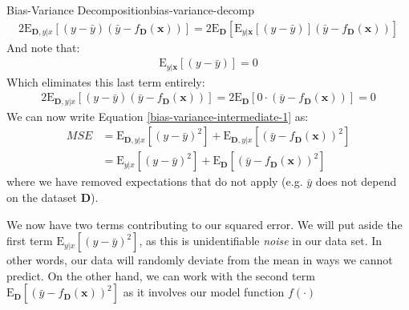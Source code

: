 \begin{derivation}{Bias-Variance Decomposition}{bias-variance-decomp}
    \begin{align*}
        2\mathrm{E}_{\textbf{D},y|x}[(y - \bar{y})(\bar{y} - f_\textbf{D}(\textbf{x}))] = 2\mathrm{E}_{\textbf{D}}[\mathrm{E}_{y|\textbf{x}}[(y - \bar{y})](\bar{y} - f_\textbf{D}(\textbf{x}))]
    \end{align*}
    And note that:
    \begin{align*}
        \mathrm{E}_{y|\textbf{x}}[(y - \bar{y})] = 0
    \end{align*}
    Which eliminates this last term entirely:
    \begin{align*}
        2\mathrm{E}_{\textbf{D},y|x}[(y - \bar{y})(\bar{y} - f_\textbf{D}(\textbf{x}))] = 2\mathrm{E}_{\textbf{D}}[0 \cdot (\bar{y} - f_\textbf{D}(\textbf{x}))] = 0
    \end{align*}
    We can now write Equation \ref{bias-variance-intermediate-1} as:
    \begin{eqnarray} \label{bias-variance-intermediate-2}
      \textit{MSE} &= \mathrm{E}_{\textbf{D},y|x}[(y - \bar{y})^{2}] + \mathrm{E}_{\textbf{D},y|x}[(\bar{y} - f_\textbf{D}(\textbf{x}))^{2}] \\
      &= \mathrm{E}_{y|x}[(y - \bar{y})^{2}] + \mathrm{E}_{\textbf{D}}[(\bar{y} - f_\textbf{D}(\textbf{x}))^{2}] \nonumber
    \end{eqnarray}
    where we have removed expectations that do not apply (e.g. $\bar{y}$ does not depend on the dataset $\textbf{D}$). 
    
    We now have two terms contributing to our squared error. We will put aside the first term $\mathrm{E}_{y|x}[(y - \bar{y})^{2}]$, as this is unidentifiable \textit{noise} in our data set. In other words, our data will randomly deviate from the mean in ways we cannot predict. On the other hand, we can work with the second term $\mathrm{E}_\textbf{D}[(\bar{y} - f_\textbf{D}(\textbf{x}))^{2}]$ as it involves our model function $f(\cdot)$ \\


\end{derivation}
